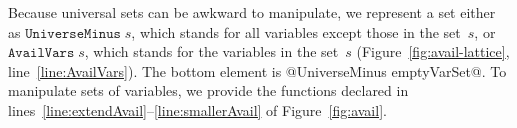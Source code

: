\documentclass[blockstyle,preprint,natbib,nocopyrightspace]{sigplanconf}
\newcommand\lineref[1]{line~\ref{line:#1}}
\newcommand\linerangeref[2]{\mbox{lines~\ref{line:#1}--\ref{line:#2}}}
\def\authornote#1{\unskip\relax}
\newcommand{\john}[1]{\authornote{JD: #1}}
\newcommand\figref[1]{Figure~\ref{fig:#1}}
\begin{document}


Because universal sets can be awkward to manipulate, we represent a
set either as
$\mathtt{UniverseMinus}\;s$, which stands for all variables except
those in the set~$s$,
or $\mathtt{AvailVars}\;s$, which stands for the variables in the set~$s$
(\figref{avail-lattice}, \lineref{AvailVars}).
%
%
The bottom element is @UniverseMinus emptyVarSet@.
To manipulate sets of variables, we provide the functions declared in
\linerangeref{extendAvail}{smallerAvail} of \figref{avail}.
%









\end{document}
